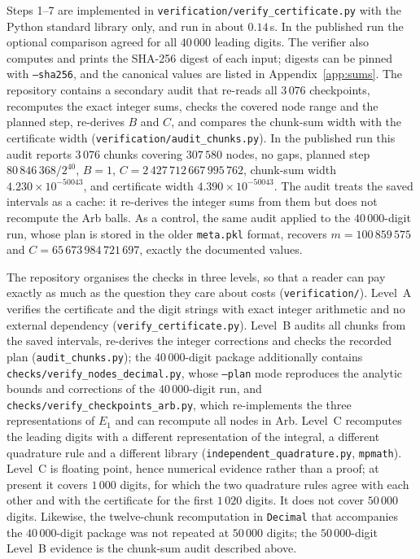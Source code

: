 \documentclass[11pt,a4paper]{article}
\theoremstyle{remark}
\newcommand{\Eone}{E_1}
\begin{document}
Steps 1--7 are implemented in \texttt{verification/verify\_certificate.py}
with the Python standard library only, and run in about $0.14$\,s. In the
published run the optional comparison agreed for all $40\,000$ leading
digits. The verifier also computes and prints the SHA-256 digest of each
input; digests can be pinned with \texttt{--sha256}, and the canonical
values are listed in Appendix~\ref{app:sums}. The repository contains a
secondary audit that re-reads all $3\,076$ checkpoints, recomputes the
exact integer sums, checks the covered node range and the planned step,
re-derives $B$ and $C$, and compares the chunk-sum width with the
certificate width (\texttt{verification/audit\_chunks.py}). In the
published run this audit reports $3\,076$ chunks covering $307\,580$
nodes, no gaps, planned step $80\,846\,368/2^{40}$, $B=1$,
$C=2\,427\,712\,667\,995\,762$, chunk-sum width
$4.230\times10^{-50043}$, and certificate width
$4.390\times10^{-50043}$. The audit treats the saved intervals as a
cache: it re-derives the integer sums from them but does not recompute
the Arb balls. As a control, the same audit applied to the
$40\,000$-digit run, whose plan is stored in the older \texttt{meta.pkl}
format, recovers $m=100\,859\,575$ and $C=65\,673\,984\,721\,697$,
exactly the documented values.

The repository organises the checks in three levels, so that a reader
can pay exactly as much as the question they care about costs
(\texttt{verification/}). Level~A verifies the certificate and the digit
strings with exact integer arithmetic and no external dependency
(\texttt{verify\_certificate.py}). Level~B audits all chunks from the
saved intervals, re-derives the integer corrections and checks the
recorded plan (\texttt{audit\_chunks.py}); the
$40\,000$-digit package additionally contains
\texttt{checks/verify\_nodes\_decimal.py}, whose \texttt{--plan} mode
reproduces the analytic bounds and corrections of the $40\,000$-digit
run, and \texttt{checks/verify\_checkpoints\_arb.py}, which re-implements
the three representations of $\Eone$ and can recompute all nodes in Arb.
Level~C recomputes the leading digits with a different representation of
the integral, a different quadrature rule and a different library
(\texttt{independent\_quadrature.py}, \texttt{mpmath}). Level~C is
floating point, hence numerical evidence rather than a proof; at present
it covers $1\,000$ digits, for which the two quadrature rules agree with
each other and with the certificate for the first $1\,020$ digits. It
does not cover $50\,000$ digits. Likewise, the twelve-chunk
recomputation in \texttt{Decimal} that accompanies the $40\,000$-digit
package was not repeated at $50\,000$ digits; the $50\,000$-digit
Level~B evidence is the chunk-sum audit described above.
\end{document}
